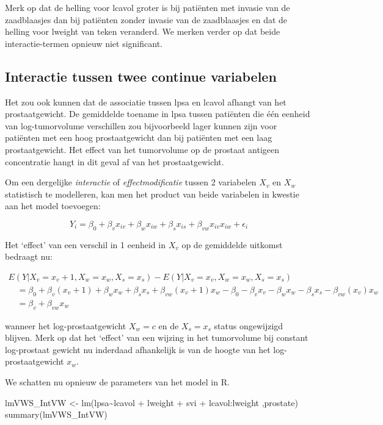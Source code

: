 \documentclass[
  dutch,
  letterpaper,
  12pt]{book}
\newenvironment{Shaded}{\begin{snugshade}}{\end{snugshade}}
\newcommand{\FunctionTok}[1]{\textcolor[rgb]{0.28,0.35,0.67}{#1}}
\newcommand{\NormalTok}[1]{\textcolor[rgb]{0.00,0.23,0.31}{#1}}
\newcommand{\OtherTok}[1]{\textcolor[rgb]{0.00,0.23,0.31}{#1}}
\newcommand{\SpecialCharTok}[1]{\textcolor[rgb]{0.37,0.37,0.37}{#1}}
\theoremstyle{definition}
\theoremstyle{definition}
\theoremstyle{definition}
\theoremstyle{remark}
\begin{document}
Merk op dat de helling voor lcavol groter is bij patiënten met invasie
van de zaadblaasjes dan bij patiënten zonder invasie van de zaadblaasjes
en dat de helling voor lweight van teken veranderd. We merken verder op
dat beide interactie-termen opnieuw niet significant.

\subsection{Interactie tussen twee continue
variabelen}\label{sec-intCont}

Het zou ook kunnen dat de associatie tussen lpsa en lcavol afhangt van
het prostaatgewicht. De gemiddelde toename in lpsa tussen patiënten die
één eenheid van log-tumorvolume verschillen zou bijvoorbeeld lager
kunnen zijn voor patiënten met een hoog prostaatgewicht dan bij
patiënten met een laag prostaatgewicht. Het effect van het tumorvolume
op de prostaat antigeen concentratie hangt in dit geval af van het
prostaatgewicht.

Om een dergelijke \textit{interactie} of \textit{effectmodificatie}
tussen 2 variabelen \(X_v\) en \(X_w\) statistisch te modelleren, kan
men het product van beide variabelen in kwestie aan het model toevoegen:

\[
Y_i = \beta_0 + \beta_v x_{iv} + \beta_w x_{iw} +\beta_s x_{is} + \beta_{vw} x_{iv}x_{iw} +\epsilon_i
\]

Het `effect' van een verschil in 1 eenheid in \(X_v\) op de gemiddelde
uitkomst bedraagt nu:

\[
\begin{array}{l}
E(Y|X_v=x_v+1,X_w=x_w,X_s=x_s) − E(Y|X_v=x_v,X_w=x_w,X_s=x_s) \\
\quad = \beta_0 + \beta_v (x_{v}+1) + \beta_w x_w +\beta_s x_{s} + \beta_{vw} (x_{v}+1) x_w - \beta_0 - \beta_v x_{v} - \beta_w x_w -\beta_s x_{s} - \beta_{vw} (x_{v}) x_w \\
\quad = \beta_v +  \beta_{vw} x_w
 \end{array}
\]

wanneer het log-prostaatgewicht \(X_w=c\) en de \(X_s=x_s\) status
ongewijzigd blijven. Merk op dat het `effect' van een wijzing in het
tumorvolume bij constant log-prostaat gewicht nu inderdaad afhankelijk
is van de hoogte van het log-prostaatgewicht \(x_w\).

We schatten nu opnieuw de parameters van het model in R.

\begin{Shaded}
\begin{Highlighting}[]
\NormalTok{lmVWS\_IntVW }\OtherTok{\textless{}{-}} \FunctionTok{lm}\NormalTok{(lpsa}\SpecialCharTok{\textasciitilde{}}\NormalTok{lcavol }\SpecialCharTok{+}\NormalTok{ lweight }\SpecialCharTok{+}\NormalTok{ svi }\SpecialCharTok{+}\NormalTok{ lcavol}\SpecialCharTok{:}\NormalTok{lweight ,prostate)}
\FunctionTok{summary}\NormalTok{(lmVWS\_IntVW)}
\end{Highlighting}
\end{Shaded}
\end{document}
